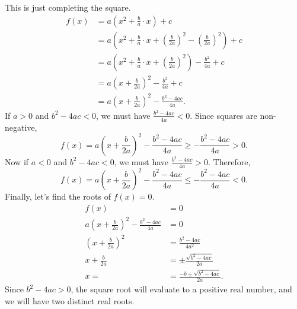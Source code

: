 \begin{solution}
    This is just completing the square.
    \begin{align*}
        f(x) &= a \left( x^2 + \frac{b}{a} \cdot x \right) + c\\
        &= a \left( x^2 + \frac{b}{a} \cdot x + \left( \frac{b}{2a} \right)^2 - \left( \frac{b}{2a} \right)^2 \right) + c\\
        &= a \left( x^2 + \frac{b}{a} \cdot x + \left( \frac{b}{2a} \right)^2 \right) - \frac{b^2}{4a} + c\\
        &= a \left( x + \frac{b}{2a} \right)^2 - \frac{b^2}{4a} + c\\
        &= a \left( x + \frac{b}{2a} \right)^2 - \frac{b^2 - 4ac}{4a}.
    \end{align*}
    If $a > 0$ and $b^2 - 4ac < 0$, we must have $\frac{b^2 - 4ac}{4a} < 0$.
    Since squares are non-negative,
    \[ f(x) = a \left( x + \frac{b}{2a} \right)^2 - \frac{b^2 - 4ac}{4a} \geq
    -\frac{b^2 - 4ac}{4a} > 0. \]
    Now if $a < 0$ and $b^2 - 4ac < 0$, we must have $\frac{b^2 - 4ac}{4a} >
    0$. Therefore,
    \[ f(x) = a \left( x + \frac{b}{2a} \right)^2 - \frac{b^2 - 4ac}{4a} \leq
    -\frac{b^2 - 4ac}{4a} < 0. \]
    Finally, let's find the roots of $f(x) = 0$.
    \begin{align*}
        f(x) &= 0\\
        a \left( x + \frac{b}{2a} \right)^2 - \frac{b^2 - 4ac}{4a} &= 0\\
        \left( x + \frac{b}{2a} \right)^2 &= \frac{b^2 - 4ac}{4a^2}\\
        x + \frac{b}{2a} &= \pm \frac{\sqrt{b^2 - 4ac}}{2a}\\
        x = &= \frac{-b \pm \sqrt{b^2 - 4ac}}{2a}. 
    \end{align*}
    Since $b^2 - 4ac > 0$, the square root will evaluate to a positive real
    number, and we will have two distinct real roots.
\end{solution}


